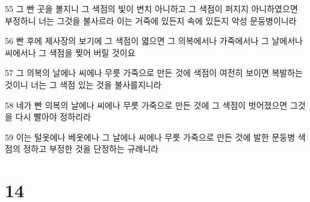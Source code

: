 \par 55 그 빤 곳을 볼지니 그 색점의 빛이 변치 아니하고 그 색점이 퍼지지 아니하였으면 부정하니 너는 그것을 불사르라 이는 거죽에 있든지 속에 있든지 악성 문둥병이니라
\par 56 빤 후에 제사장의 보기에 그 색점이 엷으면 그 의복에서나 가죽에서나 그 날에서나 씨에서나 그 색점을 찢어 버릴 것이요
\par 57 그 의복의 날에나 씨에나 무릇 가죽으로 만든 것에 색점이 여전히 보이면 복발하는 것이니 너는 그 색점 있는 것을 불사를지니라
\par 58 네가 빤 의복의 날에나 씨에나 무릇 가죽으로 만든 것에 그 색점이 벗어졌으면 그것을 다시 빨아야 정하리라
\par 59 이는 털옷에나 베옷에나 그 날에나 씨에나 무릇 가죽으로 만든 것에 발한 문둥병 색점의 정하고 부정한 것을 단정하는 규례니라

\chapter{14}

